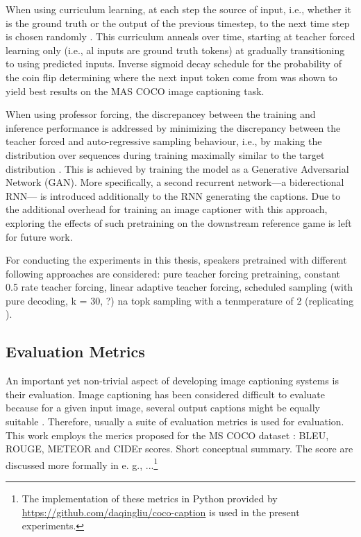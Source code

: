 When using curriculum learning, at each step the source of input, i.e., whether it is the ground truth or the output of the previous timestep, to the next time step is chosen randomly \parencite{bengio2015scheduled}. This curriculum anneals over time, starting at teacher forced learning only (i.e., al inputs are ground truth tokens) at gradually transitioning to using predicted inputs. Inverse sigmoid decay schedule for the probability of the coin flip determining where the next input token come from was shown to yield best results on the MAS COCO image captioning task.

When using professor forcing, the discrepancey between the training and inference performance is addressed by minimizing the discrepancy between the teacher forced and auto-regressive sampling behaviour, i.e., by making the distribution over sequences during training maximally similar to the target distribution \parencite{lamb2016professor}. This is achieved by training the model as a Generative Adversarial Network (GAN). More specifically, a second recurrent network---a biderectional RNN---  is introduced additionally to the RNN generating the captions. Due to the additional overhead for training an image captioner with this approach, exploring the effects of such pretraining on the downstream reference game is left for future work.

For conducting the experiments in this thesis, speakers pretrained with different following approaches are considered: pure teacher forcing pretraining, constant 0.5 rate teacher forcing, linear adaptive teacher forcing, scheduled sampling (with pure decoding, k = 30, ?) na topk sampling with a tenmperature of 2 (replicating \cite{lazaridou2020multi}). 

\subsection{Evaluation Metrics}
An important yet non-trivial aspect of developing image captioning systems is their evaluation. Image captioning has been considered difficult to evaluate because for a given input image, several output captions might be equally suitable . Therefore, usually a suite of evaluation metrics is used for evaluation. This work employs the merics proposed for the MS COCO dataset \parencite{chen2015microsoft}: BLEU, ROUGE, METEOR and CIDEr scores. Short conceptual summary. The score are discussed more formally in e. g., \cite{chen2015microsoft}...\footnote{The implementation of these metrics in Python provided by \url{https://github.com/daqingliu/coco-caption} is used in the present experiments.}    

